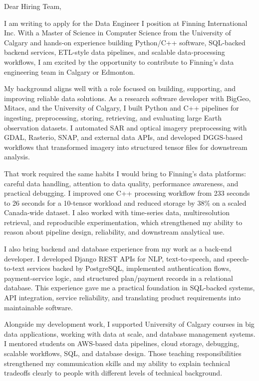 \documentclass[11pt]{letter}
\begin{document}
\begin{letter}{}

\opening{Dear Hiring Team,}

I am writing to apply for the Data Engineer I position at Finning International Inc. With a Master of Science in Computer Science from the University of Calgary and hands-on experience building Python/C++ software, SQL-backed backend services, ETL-style data pipelines, and scalable data-processing workflows, I am excited by the opportunity to contribute to Finning's data engineering team in Calgary or Edmonton.

My background aligns well with a role focused on building, supporting, and improving reliable data solutions. As a research software developer with BigGeo, Mitacs, and the University of Calgary, I built Python and C++ pipelines for ingesting, preprocessing, storing, retrieving, and evaluating large Earth observation datasets. I automated SAR and optical imagery preprocessing with GDAL, Rasterio, SNAP, and external data APIs, and developed DGGS-based workflows that transformed imagery into structured tensor files for downstream analysis.

That work required the same habits I would bring to Finning's data platforms: careful data handling, attention to data quality, performance awareness, and practical debugging. I improved one C++ processing workflow from 233 seconds to 26 seconds for a 10-tensor workload and reduced storage by 38\% on a scaled Canada-wide dataset. I also worked with time-series data, multiresolution retrieval, and reproducible experimentation, which strengthened my ability to reason about pipeline design, reliability, and downstream analytical use.

I also bring backend and database experience from my work as a back-end developer. I developed Django REST APIs for NLP, text-to-speech, and speech-to-text services backed by PostgreSQL, implemented authentication flows, payment-service logic, and structured plan/payment records in a relational database. This experience gave me a practical foundation in SQL-backed systems, API integration, service reliability, and translating product requirements into maintainable software.

Alongside my development work, I supported University of Calgary courses in big data applications, working with data at scale, and database management systems. I mentored students on AWS-based data pipelines, cloud storage, debugging, scalable workflows, SQL, and database design. Those teaching responsibilities strengthened my communication skills and my ability to explain technical tradeoffs clearly to people with different levels of technical background.


\end{letter}
\end{document}
